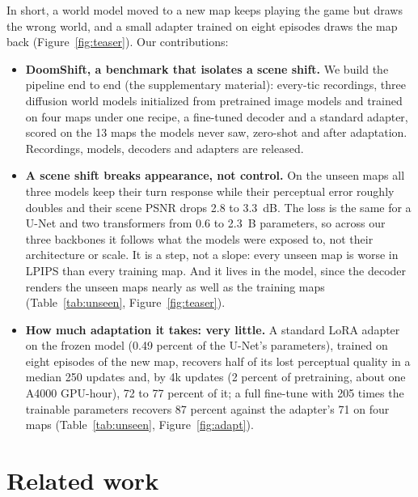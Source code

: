 \documentclass{article}
\newif\ifwithappendix \withappendixfalse %
\newcommand{\appref}[1]{\ifwithappendix Appendix~\ref{#1}\else the supplementary material\fi}
\begin{document}
In short, a world model moved to a new map keeps playing the game but draws the wrong world, and a small adapter trained on eight episodes draws the map back (Figure~\ref{fig:teaser}). Our contributions:
\begin{itemize}\setlength{\itemsep}{0pt}
\item \textbf{DoomShift, a benchmark that isolates a scene shift.} We build the pipeline end to end (\appref{app:overview}): every-tic recordings, three diffusion world models initialized from pretrained image models and trained on four maps under one recipe, a fine-tuned decoder and a standard adapter, scored on the 13 maps the models never saw, zero-shot and after adaptation. Recordings, models, decoders and adapters are released.
\item \textbf{A scene shift breaks appearance, not control.} On the unseen maps all three models keep their turn response while their perceptual error roughly doubles and their scene PSNR drops 2.8 to 3.3~dB. The loss is the same for a U-Net and two transformers from 0.6 to 2.3~B parameters, so across our three backbones it follows what the models were exposed to, not their architecture or scale. It is a step, not a slope: every unseen map is worse in LPIPS than every training map. And it lives in the model, since the decoder renders the unseen maps nearly as well as the training maps (Table~\ref{tab:unseen}, Figure~\ref{fig:teaser}).
\item \textbf{How much adaptation it takes: very little.} A standard LoRA adapter on the frozen model (0.49 percent of the U-Net's parameters), trained on eight episodes of the new map, recovers half of its lost perceptual quality in a median 250 updates and, by 4k updates (2 percent of pretraining, about one A4000 GPU-hour), 72 to 77 percent of it; a full fine-tune with 205 times the trainable parameters recovers 87 percent against the adapter's 71 on four maps (Table~\ref{tab:unseen}, Figure~\ref{fig:adapt}).
\end{itemize}



\section{Related work}
\label{sec:related}
\end{document}
